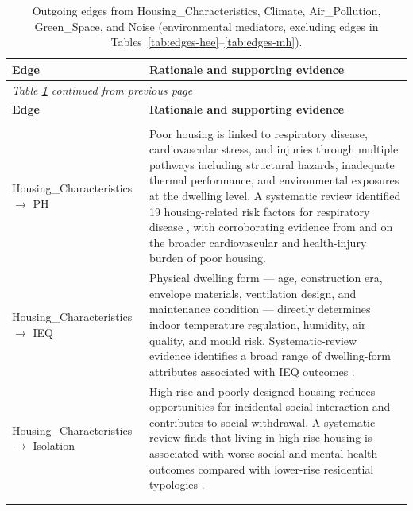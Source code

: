 \begin{longtable}{@{}p{3.8cm}p{11.2cm}@{}}
\caption{Outgoing edges from Housing\_Characteristics, Climate, Air\_Pollution, Green\_Space, and Noise (environmental mediators, excluding edges in Tables~\ref{tab:edges-hee}--\ref{tab:edges-mh}).}
\label{tab:edges-envmediators}\\
\toprule
\textbf{Edge} & \textbf{Rationale and supporting evidence} \\
\midrule
\endfirsthead
\multicolumn{2}{l}{\textit{Table \ref{tab:edges-envmediators} continued from previous page}}\\
\toprule
\textbf{Edge} & \textbf{Rationale and supporting evidence} \\
\midrule
\endhead
\bottomrule
\endfoot
\multicolumn{2}{@{}l}{\textit{Housing\_Characteristics outgoing edges}}\\
\addlinespace
Housing\_Characteristics $\to$ PH & Poor housing is linked to respiratory disease, cardiovascular stress, and injuries through multiple pathways including structural hazards, inadequate thermal performance, and environmental exposures at the dwelling level. A systematic review identified 19 housing-related risk factors for respiratory disease \citep{wimalasena_housing_2021}, with corroborating evidence from \citet{holden_impact_2023} and \citet{garrison_housing_2025} on the broader cardiovascular and health-injury burden of poor housing. \\
\addlinespace
Housing\_Characteristics $\to$ IEQ & Physical dwelling form --- age, construction era, envelope materials, ventilation design, and maintenance condition --- directly determines indoor temperature regulation, humidity, air quality, and mould risk. Systematic-review evidence identifies a broad range of dwelling-form attributes associated with IEQ outcomes \citep{holden_impact_2023, alfakih_indoor_2025, sharpe_fuel_2015}. \\
\addlinespace
Housing\_Characteristics $\to$ Isolation & High-rise and poorly designed housing reduces opportunities for incidental social interaction and contributes to social withdrawal. A systematic review finds that living in high-rise housing is associated with worse social and mental health outcomes compared with lower-rise residential typologies \citep{barros_social_2019}. \\
\addlinespace
\multicolumn{2}{@{}l}{\textit{Overcrowding outgoing edges (to IEQ)}}\\
\addlinespace

\end{longtable}
